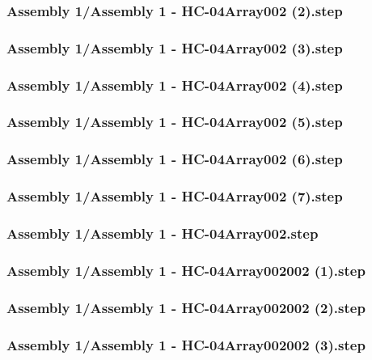 \documentclass[a4paper,12pt]{article}
\begin{document}
\subsubsection{Assembly 1/Assembly 1 - HC-04Array002 (2).step}

\subsubsection{Assembly 1/Assembly 1 - HC-04Array002 (3).step}

\subsubsection{Assembly 1/Assembly 1 - HC-04Array002 (4).step}

\subsubsection{Assembly 1/Assembly 1 - HC-04Array002 (5).step}

\subsubsection{Assembly 1/Assembly 1 - HC-04Array002 (6).step}

\subsubsection{Assembly 1/Assembly 1 - HC-04Array002 (7).step}

\subsubsection{Assembly 1/Assembly 1 - HC-04Array002.step}

\subsubsection{Assembly 1/Assembly 1 - HC-04Array002002 (1).step}

\subsubsection{Assembly 1/Assembly 1 - HC-04Array002002 (2).step}

\subsubsection{Assembly 1/Assembly 1 - HC-04Array002002 (3).step}

\end{document}
